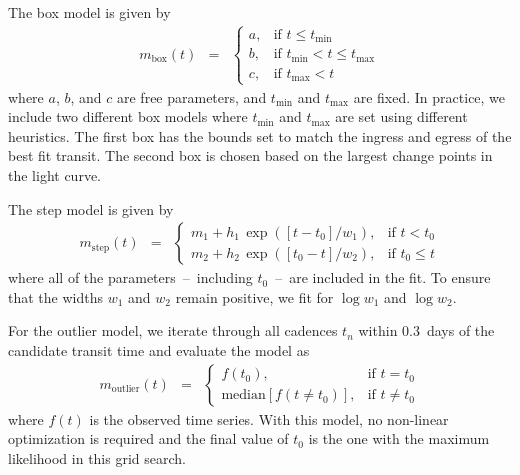 \documentclass[manuscript, letterpaper]{aastex6}
\newcommand{\modelname}[1]{{\textsf{#1}}}
\begin{document}
\begin{itemize}

{\item
The \modelname{box} model is given by
\begin{eqnarray}
m_\mathrm{box}(t) &=& \left\{\begin{array}{ll}
a, & \mbox{if $t \le t_\mathrm{min}$} \\
b, & \mbox{if $t_\mathrm{min} < t \le t_\mathrm{max}$} \\
c, & \mbox{if $t_\mathrm{max} < t$}
\end{array}\right.
\end{eqnarray}
where $a$, $b$, and $c$ are free parameters, and $t_\mathrm{min}$ and
$t_\mathrm{max}$ are fixed.
In practice, we include two different \modelname{box} models where
$t_\mathrm{min}$ and $t_\mathrm{max}$ are set using different heuristics.
The first \modelname{box} has the bounds set to match the ingress and
egress of the best fit \modelname{transit}.
The second \modelname{box} is chosen based on the largest change points in the
light curve.
}

{\item
The \modelname{step} model is given by
\begin{eqnarray}
m_\mathrm{step}(t) &=& \left\{\begin{array}{ll}
m_1 + h_1\,\exp\left([t - t_0] / w_1\right), & \mbox{if $t < t_0$} \\
m_2 + h_2\,\exp\left([t_0 - t] / w_2\right), & \mbox{if $t_0 \le t$}
\end{array}\right.
\end{eqnarray}
where all of the parameters~--~including $t_0$~--~are included in the fit.
To ensure that the widths $w_1$ and $w_2$ remain positive, we fit for
$\log w_1$ and $\log w_2$.
}

{\item
For the \modelname{outlier} model, we iterate through all cadences $t_n$
within 0.3~days of the candidate transit time and evaluate the model as
\begin{eqnarray}
m_\mathrm{outlier}(t) &=& \left\{\begin{array}{ll}
f(t_0), & \mbox{if $t = t_0$} \\
\mathrm{median}[f(t \ne t_0)], & \mbox{if $t \ne t_0$}
\end{array}\right.
\end{eqnarray}
where $f(t)$ is the observed time series.
With this model, no non-linear optimization is required and the final value of
$t_0$ is the one with the maximum likelihood in this grid search.
}


\end{itemize}
\end{document}
